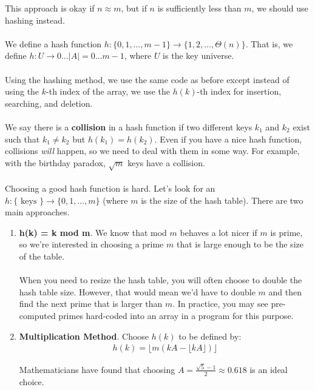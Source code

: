 \documentclass[]{article}
\theoremstyle{definition}
\newcommand{\lecture}[1]{\marginpar{{\footnotesize $\leftarrow$ \underline{#1}}}}
\begin{document}
		This approach is okay if $n \approx m$, but if $n$ is sufficiently less than $m$, we should use hashing instead.
		\\ \\
		We define a hash function $h: \{0, 1, \ldots, m - 1\} \to \{1, 2, \ldots, \Theta(n)\}$. That is, we define $h: U \to 0 \ldots |A| = 0 \ldots m - 1$, where $U$ is the key universe.
		\\ \\
		Using the hashing method, we use the same code as before except instead of using the $k$-th index of the array, we use the $h(k)$-th index for insertion, searching, and deletion.
		\\ \\
		We say there is a \textbf{collision} in a hash function if two different keys $k_1$ and $k_2$ exist such that $k_1 \ne k_2$ but $h(k_1) = h(k_2)$. Even if you have a nice hash function, collisions \emph{will} happen, so we need to deal with them in some way. For example, with the birthday paradox, $\sqrt{m}$ keys have a collision.
		\\ \\
		Choosing a good hash function is hard. Let's look for an $h: \{\text{ keys }\} \to \{0, 1, \ldots, m\}$ (where $m$ is the size of the hash table). There are two main approaches. \lecture{February 26, 2013}
		\begin{enumerate}
			\item \textbf{h(k) = k mod m}. We know that mod $m$ behaves a lot nicer if $m$ is prime, so we're interested in choosing a prime $m$ that is large enough to be the size of the table.
				\\ \\
				When you need to resize the hash table, you will often choose to double the hash table size. However, that would mean we'd have to double $m$ and then find the next prime that is larger than $m$. In practice, you may see pre-computed primes hard-coded into an array in a program for this purpose.
			\item \textbf{Multiplication Method}. Choose $h(k)$ to be defined by:
				\begin{align*}
					h(k) = \lfloor m(kA - \lfloor kA \rfloor) \rfloor
				\end{align*}

				Mathematicians have found that choosing $A = \frac{\sqrt 5 - 1}{2} \approx 0.618$ is an ideal choice.
		\end{enumerate}
\end{document}
